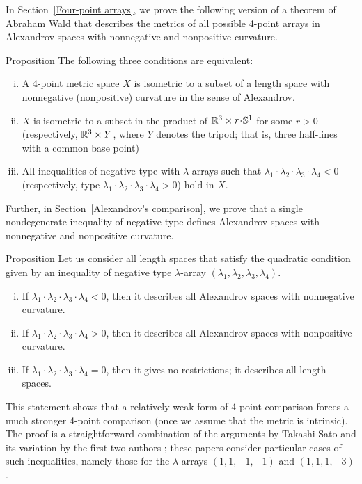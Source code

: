 \documentclass[a4paper,10pt]{article}
\begin{document}
In Section~\ref{Four-point arrays}, we prove the following version of a theorem of Abraham Wald \cite[§ 7]{wald} that describes the metrics of all possible 4-point arrays in Alexandrov spaces with nonnegative and nonpositive curvature.

\begin{thm}{Proposition}
The following three conditions are equivalent:
\begin{enumerate}[(i)]
\item A 4-point metric space $X$ is isometric to a subset of a length space with nonnegative (nonpositive) curvature in the sense of Alexandrov.
\item $X$ is isometric to a subset in the product of $\RR^3\times r\cdot \SSS^1$ for some $r>0$ (respectively, $\mathbb{R}^3\times Y$, where $Y$ denotes the tripod; that is, three half-lines with a common base point)
\item All inequalities of negative type with $\lambda$-arrays such that $\lambda_1\cdot\lambda_2\cdot\lambda_3\cdot\lambda_4<0$ (respectively, type $\lambda_1\cdot\lambda_2\cdot\lambda_3\cdot\lambda_4>0$) hold in $X$.
\end{enumerate}
\end{thm}

Further, in Section~\ref{Alexandrov's comparison}, we prove that a single nondegenerate inequality of negative type defines Alexandrov spaces with nonnegative and nonpositive curvature.

\begin{thm}{Proposition}
Let us consider all length spaces that satisfy the quadratic condition given by an inequality of negative type $\lambda$-array $(\lambda_1,\lambda_2,\lambda_3,\lambda_4)$.
\begin{enumerate}[(i)]
\item If $\lambda_1\cdot\lambda_2\cdot\lambda_3\cdot\lambda_4<0$, then it describes all Alexandrov spaces with nonnegative curvature.
\item If $\lambda_1\cdot\lambda_2\cdot\lambda_3\cdot\lambda_4>0$, then it describes all Alexandrov spaces with nonpositive curvature.
\item If $\lambda_1\cdot\lambda_2\cdot\lambda_3\cdot\lambda_4=0$, then it gives no restrictions; it describes all length spaces.
\end{enumerate}

\end{thm}

This statement shows that a relatively weak form of 4-point comparison forces a much stronger 4-point comparison (once we assume that the metric is intrinsic).
The proof is a straightforward combination of the arguments by Takashi Sato \cite{sato} and its variation by the first two authors \cite{lebedeva-petrunin-2010};
these papers consider particular cases of such inequalities, namely those for the $\lambda$-arrays $(1,1,-1,-1)$ and $(1,1,1,-3)$.
\end{document}
